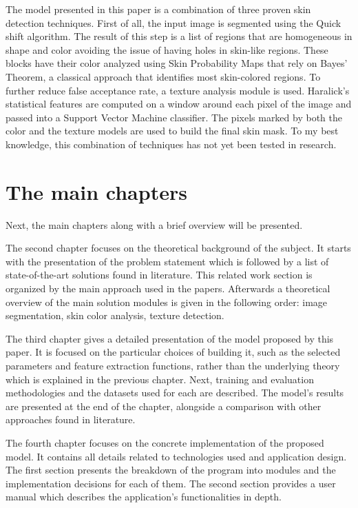 \documentclass[12pt]{report}
\begin{document}
	The model presented in this paper is a combination of three proven skin detection techniques. First of all, the input image is segmented using the Quick shift algorithm. The result of this step is a list of regions that are homogeneous in shape and color avoiding the issue of having holes in skin-like regions. These blocks have their color analyzed using Skin Probability Maps that rely on Bayes' Theorem, a classical approach that identifies most skin-colored regions. To further reduce false acceptance rate, a texture analysis module is used. Haralick's statistical features are computed on a window around each pixel of the image and passed into a Support Vector Machine classifier. The pixels marked by both the color and the texture models are used to build the final skin mask. To my best knowledge, this combination of techniques has not yet been tested in research.
	
	\section{The main chapters}
	Next, the main chapters along with a brief overview will be presented.
	
	The second chapter focuses on the theoretical background of the subject. It starts with the presentation of the problem statement which is followed by a list of state-of-the-art solutions found in literature. This related work section is organized by the main approach used in the papers. Afterwards a theoretical overview of the main solution modules is given in the following order: image segmentation, skin color analysis, texture detection.
	
	The third chapter gives a detailed presentation of the model proposed by this paper. It is focused on the particular choices of building it, such as the selected parameters and feature extraction functions, rather than the underlying theory which is explained in the previous chapter. Next, training and evaluation methodologies and the datasets used for each are described. The model's results are presented at the end of the chapter, alongside a comparison with other approaches found in literature.
	
	The fourth chapter focuses on the concrete implementation of the proposed model. It contains all details related to technologies used and application design. The first section presents the breakdown of the program into modules and the implementation decisions for each of them. The second section provides a user manual which describes the application's functionalities in depth.
	
\end{document}
